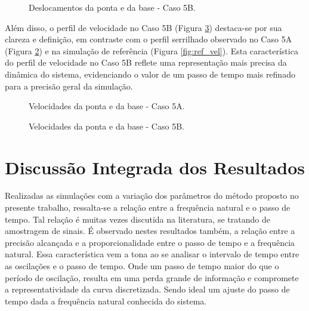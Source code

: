 \begin{figure}[H]
    \centering
    \hfill
    \caption{Deslocamentos da ponta e da base - Caso 5B.}
    \label{fig:4B_des}
\end{figure}
Além disso, o perfil de velocidade no Caso 5B (Figura \ref{fig:4B_vel}) destaca-se por sua clareza e definição, em contraste com o perfil serrilhado observado no Caso 5A (Figura \ref{fig:4A_vel}) e na simulação de referência (Figura \ref{fig:ref_vel}). Esta característica do perfil de velocidade no Caso 5B reflete uma representação mais precisa da dinâmica do sistema, evidenciando o valor de um passo de tempo mais refinado para a precisão geral da simulação.

\begin{figure}[H]
    \centering
    \hfill
    \caption{Velocidades da ponta e da base - Caso 5A.}
    \label{fig:4A_vel}
\end{figure}

\begin{figure}[H]
    \centering
    \hfill
    \caption{Velocidades da ponta e da base - Caso 5B.}
    \label{fig:4B_vel}
\end{figure}

\section{Discussão Integrada dos Resultados}
Realizadas as simulações com a variação dos parâmetros do método proposto no presente trabalho, ressalta-se a relação entre a frequência natural e o passo de tempo. Tal relação é muitas vezes discutida na literatura, se tratando de amostragem de sinais. É observado nestes resultados também, a relação entre a precisão alcançada e a proporcionalidade entre o passo de tempo e a frequência natural. Essa característica vem a tona ao se analisar o intervalo de tempo entre as oscilações e o passo de tempo. Onde um passo de tempo maior do que o período de oscilação, resulta em uma perda grande de informação e compromete a representatividade da curva discretizada. Sendo ideal um ajuste do passo de tempo dada a frequência natural conhecida do sistema.

